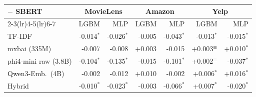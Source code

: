 \begin{tabular}{lrrrrrr}
\toprule
$-$ SBERT & \multicolumn{2}{c}{MovieLens} & \multicolumn{2}{c}{Amazon} & \multicolumn{2}{c}{Yelp} \\
\cmidrule(lr){2-3}\cmidrule(lr){4-5}\cmidrule(lr){6-7}
 & LGBM & MLP & LGBM & MLP & LGBM & MLP \\
\midrule
TF-IDF & -0.014$^{*}$ & -0.026$^{*}$ & -0.005 & -0.043$^{*}$ & -0.013$^{*}$ & -0.015$^{*}$ \\
mxbai (335M) & -0.007 & -0.008 & +0.003 & -0.015 & +0.003$^{\equiv}$ & +0.010$^{*}$ \\
phi4-mini raw (3.8B) & -0.104$^{*}$ & -0.135$^{*}$ & -0.015 & -0.101$^{*}$ & +0.002$^{\equiv}$ & -0.037$^{*}$ \\
Qwen3-Emb.\ (4B) & -0.002 & -0.012 & +0.010 & -0.002 & +0.006$^{*}$ & +0.016$^{*}$ \\
Hybrid & -0.010$^{*}$ & -0.023$^{*}$ & -0.003 & -0.066$^{*}$ & +0.007$^{*}$ & -0.020$^{*}$ \\
\bottomrule
\end{tabular}
